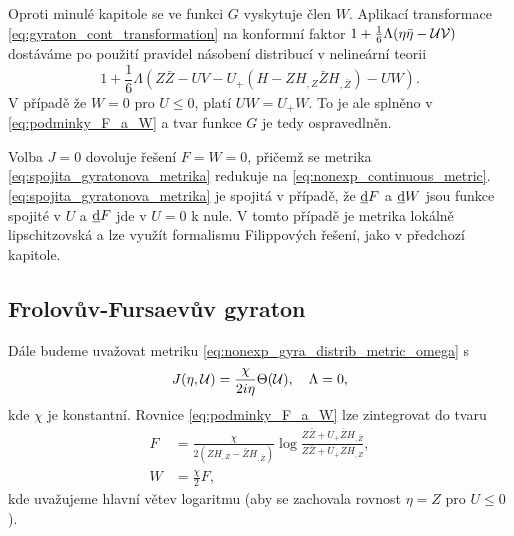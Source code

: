 Oproti minulé kapitole se ve funkci $G$ vyskytuje člen $W$. Aplikací transformace \eqref{eq:gyraton_cont_transformation}
na konformní faktor $1 + \frac{1}{6} \Lambda (\eta \bar{\eta} - \mathcal{U} \mathcal{V})$ dostáváme po použití pravidel násobení distribucí v nelineární teorii
\begin{equation}
    1 + \frac{1}{6} \Lambda \left(Z \bar{Z} - UV - U_+ (H - Z H_{,Z} \bar{Z} H_{,\bar{Z}}) - UW \right).
\end{equation}
V případě že $W = 0$ pro $U \leq 0$, platí $UW = U_+ W$. To je ale splněno v \eqref{eq:podminky_F_a_W} a tvar funkce $G$ je tedy ospravedlněn.

Volba $J=0$ dovoluje řešení $F = W = 0$, přičemž se metrika \eqref{eq:spojita_gyratonova_metrika} redukuje na \eqref{eq:nonexp_continuous_metric}.
\eqref{eq:spojita_gyratonova_metrika} je spojitá v případě, že $\underline{\mathrm{d}}F$ a $\underline{\mathrm{d}}W$ jsou funkce spojité v $U$ a $\underline{\mathrm{d}}F$
jde v $U=0$ k nule. V tomto případě je metrika lokálně lipschitzovská a lze využít formalismu Filippových řešení, jako v předchozí kapitole.


\subsection{Frolovův-Fursaevův gyraton}
Dále budeme uvažovat metriku \eqref{eq:nonexp_gyra_distrib_metric_omega} s
\begin{equation}
    J(\eta , \mathcal{U}) = \frac{\chi}{2 i \eta} \Theta( \mathcal{U} ),~~~ \Lambda = 0,
\end{equation}
kde $\chi$ je konstantní. Rovnice \eqref{eq:podminky_F_a_W} lze zintegrovat do tvaru
\begin{equation}
    \label{eq:zintegrovane1}
    \begin{split}
        F &= \frac{\chi}{2(Z H_{,Z}-\bar{Z}H_{,\bar{Z}})} \log \frac{Z\bar{Z}+U_{+}\bar{Z}H_{,\bar{Z}}}{Z\bar{Z}+U_{+}ZH_{,Z}}, \\
        W &= \frac{\chi}{2}F,
    \end{split}
\end{equation}
kde uvažujeme hlavní větev logaritmu (aby se zachovala rovnost $\eta = Z$ pro $U \leq 0$).

